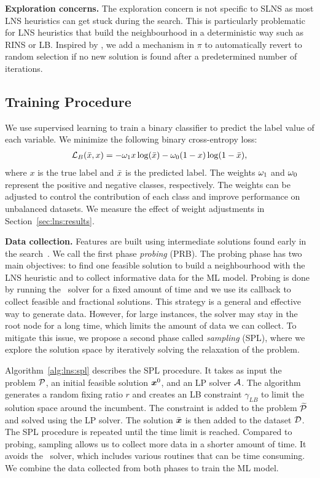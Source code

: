 \documentclass[3p, authoryear, times]{elsarticle}
\begin{document}
\textbf{Exploration concerns.} The exploration concern is not specific to SLNS as most LNS heuristics can get stuck during the search. This is particularly problematic for LNS heuristics that build the neighbourhood in a deterministic way such as RINS or LB. Inspired by \cite{huang_local_2023}, we add a mechanism in $\pi$ to automatically revert to random selection if no new solution is found after a predetermined number of iterations. %

\subsection{Training Procedure} 
We use supervised learning to train a binary classifier to predict the label value of each variable. We minimize the following binary cross-entropy loss:
\begin{align} \label{eq:lns:binloss}
    \binloss (\xbar, x) = -\wa x \log(\xbar) - \wb (1-x) \log(1-\xbar),
\end{align}
where $x$ is the true label and $\xbar$ is the predicted label. The weights $\wa$ and $\wb$ represent the positive and negative classes, respectively. The weights can be adjusted to control the contribution of each class and improve performance on unbalanced datasets. We measure the effect of weight adjustments in Section~\ref{sec:lns:results}. 

\textbf{Data collection.} Features are built using intermediate solutions found early in the search~\citep{robinson_la_rocca_one-shot_2024}. We call the first phase \textit{probing} (PRB). The probing phase has two main objectives: to find one feasible solution to build a neighbourhood with the LNS heuristic and to collect informative data for the ML model. Probing is done by running the \bnb\ solver for a fixed amount of time and we use its callback to collect feasible and fractional solutions. This strategy is a general and effective way to generate data. However, for large instances, the solver may stay in the root node for a long time, which limits the amount of data we can collect. To mitigate this issue, we propose a second phase called \textit{sampling} (SPL), where we explore the solution space by iteratively solving the relaxation of the problem. 

Algorithm~\ref{alg:lns:spl} describes the SPL procedure. It takes as input the problem $\P$, an initial feasible solution $\xb^0$, and an LP solver $\biga$. The algorithm generates a random fixing ratio $r$ and creates an LB constraint $\gamma_{LB} $ to limit the solution space around the incumbent. The constraint is added to the problem $\Plin$ and solved using the LP solver. The solution $\xbbar$ is then added to the dataset $\bigd$. The SPL procedure is repeated until the time limit is reached. Compared to probing, sampling allows us to collect more data in a shorter amount of time. It avoids the \bnb\ solver, which includes various routines that can be time consuming. We combine the data collected from both phases to train the ML model. 
\end{document}
